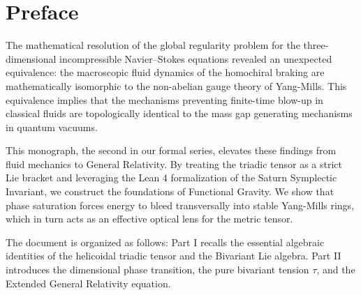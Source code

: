 \begin{abstract}
\noindent
This document explores the profound cosmological and relativistic implications of the Navier--Stokes geometric phase topology. Building upon the rigorous formalization of the Bivariant Lie Algebra and the Yang-Mills Topological Equivalence, we demonstrate that the geometric saturation of a fluid's phase induces a strict dimensional collapse (3D $\to$ 2D $\to$ 1D). This topological strangulation generates a pure bivariant tension $\tau$ that acts as a fundamental field stress. We present the Quantum Astrophysical Fluid Topology (QAFT) axioms, demonstrating how the coherence barrier $\chi$ modulates the spacetime metric $g^{\mu\nu}_{\text{eff}}$, yielding an Extended General Relativity framework where fluid dynamics dictate metric geometry without singularities.
\end{abstract}

\maketitle

\section*{Preface}

The mathematical resolution of the global regularity problem for the three-dimensional incompressible Navier--Stokes equations revealed an unexpected equivalence: the macroscopic fluid dynamics of the homochiral braking are mathematically isomorphic to the non-abelian gauge theory of Yang-Mills. This equivalence implies that the mechanisms preventing finite-time blow-up in classical fluids are topologically identical to the mass gap generating mechanisms in quantum vacuums.

This monograph, the second in our formal series, elevates these findings from fluid mechanics to General Relativity. By treating the triadic tensor as a strict Lie bracket and leveraging the Lean 4 formalization of the Saturn Symplectic Invariant, we construct the foundations of Functional Gravity. We show that phase saturation forces energy to bleed transversally into stable Yang-Mills rings, which in turn acts as an effective optical lens for the metric tensor.

The document is organized as follows:
Part I recalls the essential algebraic identities of the helicoidal triadic tensor and the Bivariant Lie algebra.
Part II introduces the dimensional phase transition, the pure bivariant tension $\tau$, and the Extended General Relativity equation.
